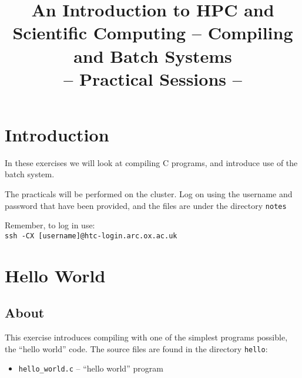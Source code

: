 \documentclass[a4paper, 12pt]{article}
\title{{\Huge\bf An Introduction to HPC and Scientific Computing -- Compiling and Batch Systems\footnotetext{Thanks to Jacob Wilkins and Ian Bush for materials.}} \\ {\huge -- Practical Sessions --}}
\date{}
\def \cc   {\tt }               %
\begin{document}
\maketitle

\vfill

\tableofcontents

\newpage


\section{Introduction}
\label{Introduction}

In these exercises we will look at compiling C programs, and introduce use of the batch system.

The practicals will be performed on the cluster. Log on using the username and password that have been provided, and the files are under the directory {\cc notes}

Remember, to log in use: \\
{\cc ssh -CX [username]@htc-login.arc.ox.ac.uk}



\section{Hello World}
\label{basics}

\subsection*{About}

This exercise introduces compiling with
one of the simplest programs possible, the ``hello world'' code.  The source
files are found in the directory {\cc hello}:
%
\begin{itemize}
  \item {\cc hello\_world.c} -- ``hello world'' program 
\end{itemize}
%
\end{document}
